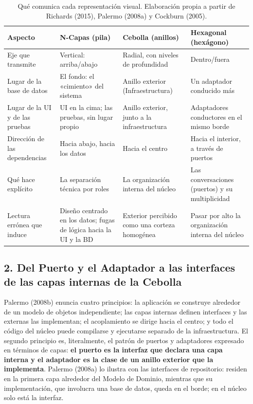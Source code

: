 \documentclass[11pt,a4paper]{article}
\begin{document}
\begin{table}[htbp]
\centering
\small
\renewcommand{\arraystretch}{1.25}
\begin{tabularx}{\linewidth}{@{}>{\raggedright\arraybackslash}p{2.6cm}LLL@{}}
\toprule
\textbf{Aspecto} & \textbf{N-Capas (pila)} & \textbf{Cebolla (anillos)} & \textbf{Hexagonal (hexágono)} \\
\midrule
Eje que transmite & Vertical: arriba/abajo & Radial, con niveles de profundidad & Dentro/fuera \\
\addlinespace
Lugar de la base de datos & El fondo: el «cimiento» del sistema & Anillo exterior (Infraestructura) & Un adaptador conducido más \\
\addlinespace
Lugar de la UI y de las pruebas & UI en la cima; las pruebas, sin lugar propio & Anillo exterior, junto a la infraestructura & Adaptadores conductores en el mismo borde \\
\addlinespace
Dirección de las dependencias & Hacia abajo, hacia los datos & Hacia el centro & Hacia el interior, a través de puertos \\
\addlinespace
Qué hace explícito & La separación técnica por roles & La organización interna del núcleo & Las conversaciones (puertos) y su multiplicidad \\
\addlinespace
Lectura errónea que induce & Diseño centrado en los datos; fugas de lógica hacia la UI y la BD & Exterior percibido como una corteza homogénea & Pasar por alto la organización interna del núcleo \\
\bottomrule
\end{tabularx}
\caption{Qué comunica cada representación visual. Elaboración propia a partir de
Richards (2015), Palermo (2008a) y Cockburn (2005).}
\label{tab:metaforas}
\end{table}

\subsection*{2. Del Puerto y el Adaptador a las interfaces de las capas internas de la Cebolla}

Palermo (2008b) enuncia cuatro principios: la aplicación se construye alrededor de un modelo de
objetos independiente; las capas internas definen interfaces y las externas las implementan;
el acoplamiento se dirige hacia el centro; y todo el código del núcleo puede compilarse y
ejecutarse separado de la infraestructura. El segundo principio es, literalmente, el patrón de
puertos y adaptadores expresado en términos de capas: \textbf{el puerto es la interfaz que
declara una capa interna y el adaptador es la clase de un anillo exterior que la implementa}.
Palermo (2008a) lo ilustra con las interfaces de repositorio: residen en la primera capa alrededor del
Modelo de Dominio, mientras que su implementación, que involucra una base de datos, queda en
el borde; en el núcleo solo está la interfaz.
\end{document}
